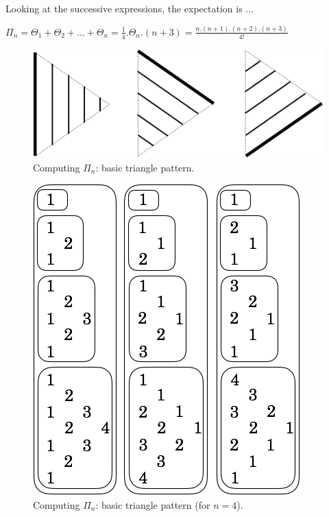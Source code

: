 Looking at the successive expressions, the expectation is ...

$\Pi_n = \Theta_1 + \Theta_2 + ... + \Theta_n = \frac{1}{4}.\Theta_n.(n+3) = \frac{n.(n+1).(n+2).(n+3)}{4!} $

\begin{figure}[h]
\begin{center}
        \includegraphics[scale=0.35]{FiguresArithmetic/appTetrahedral6}
        \caption{Computing $\Pi_n$: basic triangle pattern.}
        \label{fig:Tetrahedral6}
\end{center}
\end{figure}
\begin{figure}[h]
\begin{center}
        \includegraphics[scale=0.36]{FiguresArithmetic/appTetrahedral7}
        \caption{Computing $\Pi_n$: basic triangle pattern (for $n=4$).}
        \label{fig:Tetrahedral7}
\end{center}
\end{figure}

